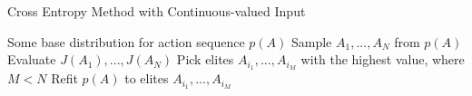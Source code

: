 \begin{algorithm}[t!]
\caption{Cross Entropy Method with Continuous-valued Input}
\begin{algorithmic}[1]
\label{alg:cem}
\REQUIRE Some base distribution for action sequence $p(A)$ 
    \STATE Sample $A_1,...,A_N$ from $p(A)$
    \STATE Evaluate $J(A_1),...,J(A_N)$
    \STATE Pick elites $A_{i_1},...,A_{i_M}$ with the highest value, where $M<N$
    \STATE Refit $p(A)$ to elites $A_{i_1},...,A_{i_M}$
\ENDWHILE
\end{algorithmic}
\end{algorithm}